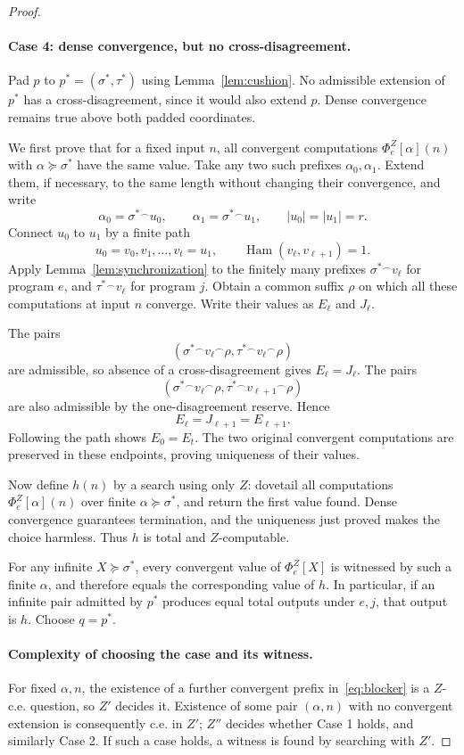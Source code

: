 \documentclass[11pt,a4paper]{article}
\newcommand{\cat}{\mathbin{{}^{\frown}}}
\newcommand{\hd}{\operatorname{Ham}}
\newcommand{\phiZ}[2]{\Phi_{#1}^{Z}[#2]}
\theoremstyle{definition}\newtheorem{definition}[theorem]{Definition}
\theoremstyle{remark}\newtheorem{remark}[theorem]{Remark}
\begin{document}
\begin{proof}
\paragraph{Case 4: dense convergence, but no cross-disagreement.}
Pad $p$ to $p^*=(\sigma^*,\tau^*)$ using Lemma~\ref{lem:cushion}. No admissible extension of $p^*$ has a cross-disagreement, since it would also extend $p$. Dense convergence remains true above both padded coordinates.

We first prove that for a fixed input $n$, all convergent computations $\phiZ{e}{\alpha}(n)$ with $\alpha\succeq\sigma^*$ have the same value. Take any two such prefixes $\alpha_0,\alpha_1$. Extend them, if necessary, to the same length without changing their convergence, and write
\[
       \alpha_0=\sigma^*\cat u_0,
       \qquad \alpha_1=\sigma^*\cat u_1,
       \qquad |u_0|=|u_1|=r.
\]
Connect $u_0$ to $u_1$ by a finite path
\[
        u_0=v_0,v_1,\ldots,v_t=u_1,
        \qquad \hd(v_\ell,v_{\ell+1})=1.
\]
Apply Lemma~\ref{lem:synchronization} to the finitely many prefixes $\sigma^*\cat v_\ell$ for program $e$, and $\tau^*\cat v_\ell$ for program $j$. Obtain a common suffix $\rho$ on which all these computations at input $n$ converge. Write their values as $E_\ell$ and $J_\ell$.

The pairs
\[
 (\sigma^*\cat v_\ell\cat\rho,
        \tau^*\cat v_\ell\cat\rho)
\]
are admissible, so absence of a cross-disagreement gives $E_\ell=J_\ell$. The pairs
\[
 (\sigma^*\cat v_\ell\cat\rho,
        \tau^*\cat v_{\ell+1}\cat\rho)
\]
are also admissible by the one-disagreement reserve. Hence
\[
               E_\ell=J_{\ell+1}=E_{\ell+1}.
\]
Following the path shows $E_0=E_t$. The two original convergent computations are preserved in these endpoints, proving uniqueness of their values.

Now define $h(n)$ by a search using only $Z$: dovetail all computations $\phiZ{e}{\alpha}(n)$ over finite $\alpha\succeq\sigma^*$, and return the first value found. Dense convergence guarantees termination, and the uniqueness just proved makes the choice harmless. Thus $h$ is total and $Z$-computable.

For any infinite $X\succeq\sigma^*$, every convergent value of $\phiZ{e}{X}$ is witnessed by such a finite $\alpha$, and therefore equals the corresponding value of $h$. In particular, if an infinite pair admitted by $p^*$ produces equal total outputs under $e,j$, that output is $h$. Choose $q=p^*$.

\paragraph{Complexity of choosing the case and its witness.}
For fixed $\alpha,n$, the existence of a further convergent prefix in~\eqref{eq:blocker} is a $Z$-c.e. question, so $Z'$ decides it. Existence of some pair $(\alpha,n)$ with no convergent extension is consequently c.e. in $Z'$; $Z''$ decides whether Case 1 holds, and similarly Case 2. If such a case holds, a witness is found by searching with $Z'$.


\end{proof}
\end{document}
